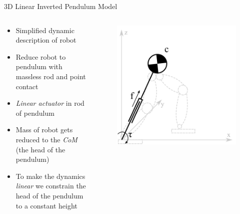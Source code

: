 \begin{frame}{3D Linear Inverted Pendulum Model}

\begin{columns}
\begin{column}{0.5\textwidth}
\begin{itemize}
\item Simplified dynamic description of robot
\item Reduce robot to pendulum with massless rod and point contact
\item \textit{Linear actuator} in rod of pendulum
\item Mass of robot gets reduced to the \textit{CoM} (the head of the pendulum)
\item To make the dynamics \textit{linear} we constrain the head of the pendulum
to a constant height
\end{itemize}
\end{column}

\begin{column}{0.5\textwidth}
\begin{figure}
  \begin{center}
     \includegraphics[width=\textwidth]{images/3dlimp.png}
  \end{center}
\end{figure}
\end{column}
\end{columns}

\end{frame}


